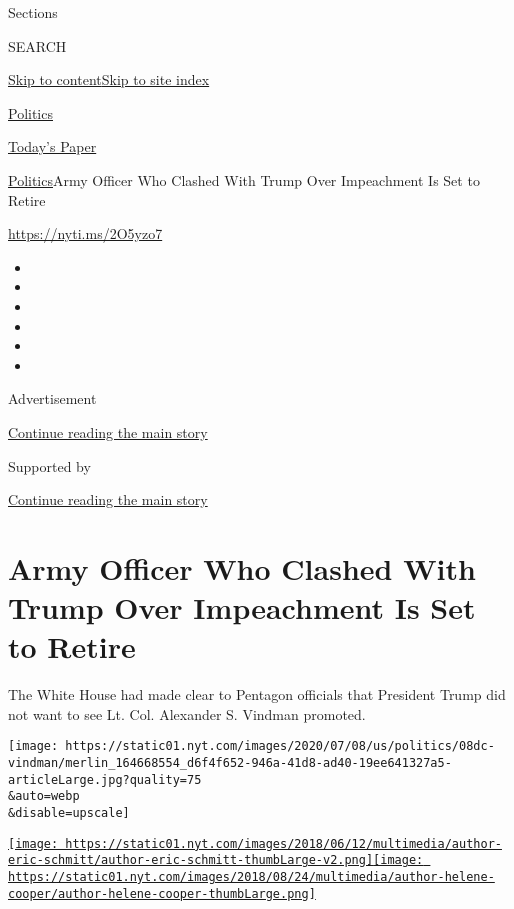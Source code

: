 Sections

SEARCH

\protect\hyperlink{site-content}{Skip to
content}\protect\hyperlink{site-index}{Skip to site index}

\href{https://www.nytimes.com/section/politics}{Politics}

\href{https://myaccount.nytimes.com/auth/login?response_type=cookie\&client_id=vi}{}

\href{https://www.nytimes.com/section/todayspaper}{Today's Paper}

\href{/section/politics}{Politics}\textbar{}Army Officer Who Clashed
With Trump Over Impeachment Is Set to Retire

\url{https://nyti.ms/2O5yzo7}

\begin{itemize}
\item
\item
\item
\item
\item
\item
\end{itemize}

Advertisement

\protect\hyperlink{after-top}{Continue reading the main story}

Supported by

\protect\hyperlink{after-sponsor}{Continue reading the main story}

\hypertarget{army-officer-who-clashed-with-trump-over-impeachment-is-set-to-retire}{%
\section{Army Officer Who Clashed With Trump Over Impeachment Is Set to
Retire}\label{army-officer-who-clashed-with-trump-over-impeachment-is-set-to-retire}}

The White House had made clear to Pentagon officials that President
Trump did not want to see Lt. Col. Alexander S. Vindman promoted.

\texttt{[image: https://static01.nyt.com/images/2020/07/08/us/politics/08dc-vindman/merlin\_164668554\_d6f4f652-946a-41d8-ad40-19ee641327a5-articleLarge.jpg?quality=75\\\&auto=webp\\\&disable=upscale]}

\href{https://www.nytimes.com/by/eric-schmitt}{\texttt{[image: https://static01.nyt.com/images/2018/06/12/multimedia/author-eric-schmitt/author-eric-schmitt-thumbLarge-v2.png]}}\href{https://www.nytimes.com/by/helene-cooper}{\texttt{[image: https://static01.nyt.com/images/2018/08/24/multimedia/author-helene-cooper/author-helene-cooper-thumbLarge.png]}}

